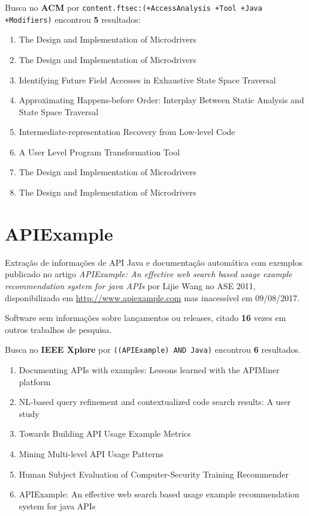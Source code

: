 Busca no {\bf ACM} por
\texttt{content.ftsec:(+AccessAnalysis +Tool +Java +Modifiers)}
encontrou {\bf 5}
resultados:

\begin{enumerate}
\item The Design and Implementation of Microdrivers
\item The Design and Implementation of Microdrivers
\item Identifying Future Field Accesses in Exhaustive State Space Traversal
\item Approximating Happens-before Order: Interplay Between Static Analysis and State Space Traversal
\item Intermediate-representation Recovery from Low-level Code
\item A User Level Program Transformation Tool
\item The Design and Implementation of Microdrivers
\item The Design and Implementation of Microdrivers
\end{enumerate}

\section{APIExample}

Extração de informações de API Java e documentação automática com exemplos
publicado no artigo {\it APIExample: An effective web search based usage example recommendation system for java APIs}
por Lijie Wang
no ASE 2011,
disponibilizado em \url{http://www.apiexample.com}
mas inacessível em 09/08/2017.

Software sem informações sobre lançamentos ou releases,
citado {\bf 16} vezes em outros trabalhos de pesquisa.

Busca no {\bf IEEE Xplore} por
\texttt{((APIExample) AND Java)}
encontrou {\bf 6}
resultados.

\begin{enumerate}
\item Documenting APIs with examples: Lessons learned with the APIMiner platform
\item NL-based query refinement and contextualized code search results: A user study
\item Towards Building API Usage Example Metrics
\item Mining Multi-level API Usage Patterns
\item Human Subject Evaluation of Computer-Security Training Recommender
\item APIExample: An effective web search based usage example recommendation system for java APIs
\end{enumerate}

